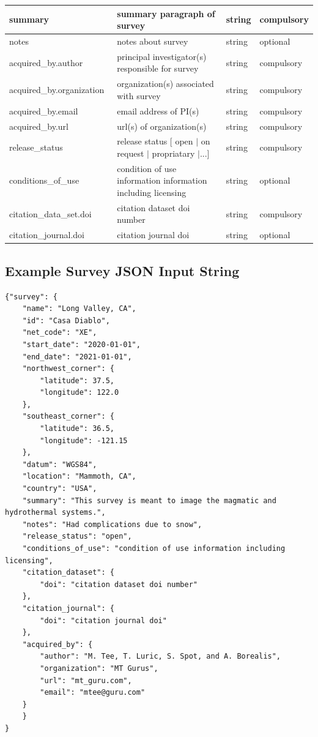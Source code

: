 \documentclass{article}
\begin{document}
\begin{table}[htb!]
\begin{tabular}{|l|p{3.65in}|l|l|}
		summary\ & summary paragraph of survey & string & compulsory \\ \hline
		notes\ & notes about survey & string & optional \\ \hline
		acquired\_by.author\ & principal investigator(s) responsible for survey & string & compulsory \\ \hline
		acquired\_by.organization\ & organization(s) associated with survey & string & compulsory \\ \hline
		acquired\_by.email\ & email address of PI(s) & string & compulsory \\ \hline
		acquired\_by.url\ & url(s) of organization(s) & string & compulsory \\ \hline
		release\_status\ & release status [ open $|$ on request $|$ propriatary $|$...] & string & compulsory \\ \hline
		conditions\_of\_use\ & condition of use information information including licensing & string & optional \\ \hline
		citation\_data\_set.doi & citation dataset doi number & string & compulsory \\ \hline
		citation\_journal.doi & citation journal doi & string & optional \\ \hline
	\end{tabular}
	\label{tab:survey}
\end{table} 

\newpage
\subsection{Example Survey JSON Input String}

\begin{verbatim}
{"survey": {
    "name": "Long Valley, CA",
    "id": "Casa Diablo",
    "net_code": "XE",
    "start_date": "2020-01-01",
    "end_date": "2021-01-01",
    "northwest_corner": {
        "latitude": 37.5,
        "longitude": 122.0
    },
    "southeast_corner": {
        "latitude": 36.5,
        "longitude": -121.15
    },
    "datum": "WGS84",
    "location": "Mammoth, CA",
    "country": "USA",
    "summary": "This survey is meant to image the magmatic and hydrothermal systems.",
    "notes": "Had complications due to snow",
    "release_status": "open",
    "conditions_of_use": "condition of use information including licensing",
    "citation_dataset": {
        "doi": "citation dataset doi number"
    },
    "citation_journal": {
        "doi": "citation journal doi"
    },
    "acquired_by": {
        "author": "M. Tee, T. Luric, S. Spot, and A. Borealis",
        "organization": "MT Gurus",
        "url": "mt_guru.com",
        "email": "mtee@guru.com"
    }
    }
}
\end{verbatim}
\end{document}
